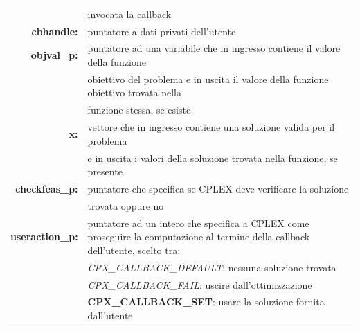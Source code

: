 \begin{center}
\begin{center}
\begin{table}[h]
\begin{tabular}{rl}
&{invocata la callback}\\
\textbf{cbhandle:} & {puntatore a dati privati dell'utente}\\
\textbf{objval\_p:} & {puntatore ad una variabile che in ingresso contiene il valore della funzione}\\
&{ obiettivo del problema e in uscita il valore della funzione obiettivo trovata nella }\\
&{funzione stessa, se esiste}\\
\textbf{x:} & {vettore che in ingresso contiene una soluzione valida per il problema }\\
&{e in uscita i valori della soluzione trovata nella funzione, se presente}\\
\textbf{checkfeas\_p:} & {puntatore che specifica se CPLEX deve verificare la soluzione }\\
&{trovata oppure no}\\
\textbf{useraction\_p:} & {puntatore ad un intero che specifica a CPLEX come proseguire la computazione al termine della callback dell'utente, scelto tra:}\\
&{\textit{CPX\_CALLBACK\_DEFAULT}: nessuna soluzione trovata}\\
&{\textit{CPX\_CALLBACK\_FAIL}: uscire dall'ottimizzazione}\\
&{\textbf{CPX\_CALLBACK\_SET}}: usare la soluzione fornita dall'utente\\
\end{tabular}
\end{table}

\end{center}
\end{center}
